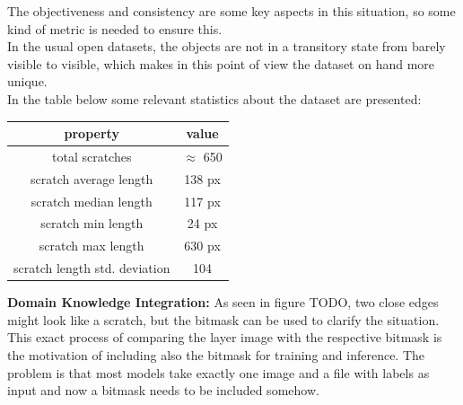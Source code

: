 The objectiveness and consistency are some key aspects in this situation, so some kind of metric is needed to ensure this.\\
In the usual open datasets, the objects are not in a transitory state from barely visible to visible, which makes in this point of view the dataset on hand more unique. \\
In the table below some relevant statistics about the dataset are presented:
\begin{center}
\begin{tabular}{ ||c|c|| }
\hline
property & value \\ [0.5ex]
\hline\hline
total scratches & $\approx$ 650 \\
scratch average length & 138 px \\
scratch median length & 117 px \\
scratch min length & 24 px \\
scratch max length & 630 px \\
scratch length std. deviation & 104 \\

\hline
\end{tabular}
\end{center}


\textbf{Domain Knowledge Integration:}
As seen in figure TODO, two close edges might look like a scratch, but the bitmask can be used to clarify the situation. This exact process of comparing the layer image with the respective bitmask is the motivation of including also the bitmask for training and inference. The problem is that most models take exactly one image and a file with labels as input and now a bitmask needs to be included somehow.\\

